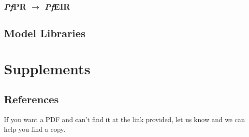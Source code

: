\documentclass[
]{book}
\begin{document}
\hypertarget{pr2eir}{%
\section{\texorpdfstring{\emph{Pf}PR \(\rightarrow\) \emph{Pf}EIR}{PfPR \textbackslash rightarrow PfEIR}}\label{pr2eir}}

\hypertarget{model-libraries}{%
\chapter{Model Libraries}\label{model-libraries}}

\hypertarget{part-supplements}{%
\part{Supplements}\label{part-supplements}}

\hypertarget{references}{%
\chapter{References}\label{references}}

If you want a PDF and can't find it at the link provided, let us know and we can help you find a copy.
\end{document}
